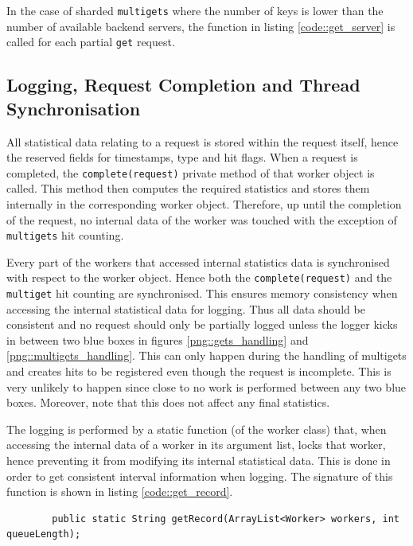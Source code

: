 \documentclass[11pt,a4paper]{article}
\newenvironment{code}{\captionsetup{type=listing}}{}
\begin{document}
In the case of sharded \texttt{multigets} where the number of keys is lower than the number of available backend servers, the function in listing \ref{code::get_server} is called for each partial \texttt{get} request.

\subsection{Logging, Request Completion and Thread Synchronisation}
All statistical data relating to a request is stored within the request itself, hence the reserved fields for timestamps, type and hit flags. When a request is completed, the \texttt{complete(request)} private method of that worker object is called. This method then computes the required statistics and stores them internally in the corresponding worker object. Therefore, up until the completion of the request, no internal data of the worker was touched with the exception of \texttt{multigets} hit counting.

Every part of the workers that accessed internal statistics data is synchronised with respect to the worker object. Hence both the \texttt{complete(request)} and the \texttt{multiget} hit counting are synchronised. This ensures memory consistency when accessing the internal statistical data for logging. Thus all data should be consistent and no request should only be partially logged unless the logger kicks in between two blue boxes in figures \ref{png::gets_handling} and \ref{png::multigets_handling}. This can only happen during the handling of multigets and creates hits to be registered even though the request is incomplete. This is very unlikely to happen since close to no work is performed between any two blue boxes. Moreover, note that this does not affect any final statistics.

The logging is performed by a static function (of the worker class) that, when accessing the internal data of a worker in its argument list, locks that worker, hence preventing it from modifying its internal statistical data. This is done in order to get consistent interval information when logging. The signature of this function is shown in listing \ref{code::get_record}.

\begin{code}
    \label{code::get_record}
    \begin{verbatim}
        public static String getRecord(ArrayList<Worker> workers, int queueLength);
    \end{verbatim}
\end{code}
\end{document}
